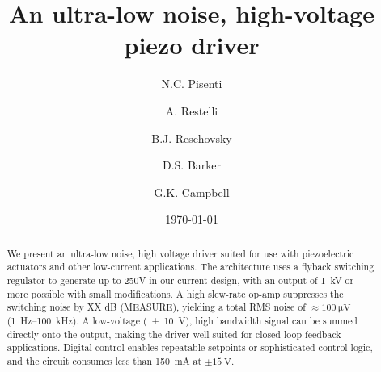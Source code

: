 \documentclass[aip,rsi,reprint]{revtex4-1} %
\begin{document}

\title{An ultra-low noise, high-voltage piezo driver}



\author{N.C. Pisenti}
\author{A. Restelli}
\author{B.J. Reschovsky}
\author{D.S. Barker}
\author{G.K. Campbell}


\date{\today}

\begin{abstract}
We present an ultra-low noise, high voltage driver suited for use with piezoelectric actuators and other low-current applications. 
The architecture uses a flyback switching regulator to generate up to 250V in our current design, with an output of \SI{1}{\kilo\volt} or more possible with small modifications. 
A high slew-rate op-amp suppresses the switching noise by XX dB (MEASURE), yielding a total RMS noise of $\approx\SI{100}{\micro\volt}$ (\SI{1}{\hertz}--\SI{100}{\kilo\hertz}).
A low-voltage (\SI{\pm 10}{\volt}), high bandwidth signal can be summed directly onto the output, making the driver well-suited for closed-loop feedback applications.
Digital control enables repeatable setpoints or sophisticated control logic, and the circuit consumes less than \SI{150}{\milli\ampere} at $\pm\SI{15}{\volt}$.
\end{abstract}

\pacs{}%

\maketitle %
\end{document}
